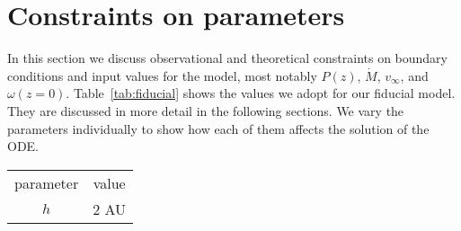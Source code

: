 \section{Constraints on parameters}
\label{sect:parameters}
In this section we discuss observational and theoretical constraints on boundary conditions and input values for the model, most notably $P(z)$, $\dot M$, $v_\infty$, and $\omega(z=0)$. Table~\ref{tab:fiducial} shows the values we adopt for our fiducial model. They are discussed in more detail in the following sections. We vary the parameters individually to show how each of them affects the solution of the ODE. 
\begin{table}
\begin{tabular}{cc}
parameter & value\\
$h$ & 2 AU\\
\end{tabular}
\end{table}